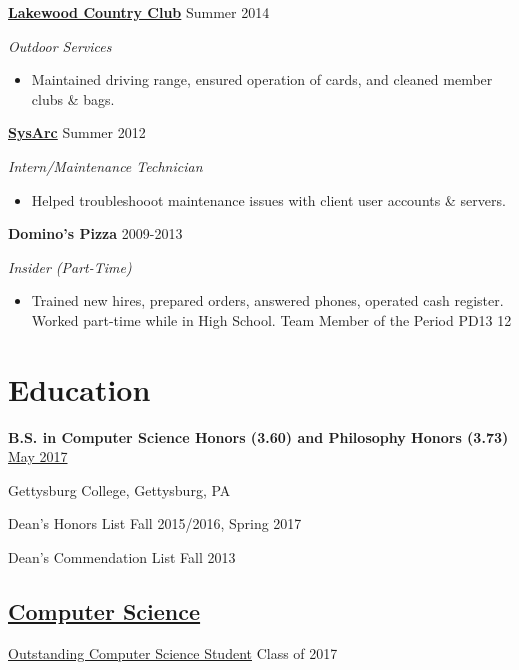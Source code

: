 \documentclass[11pt]{article}
\begin{document}
\textbf{\href{http://www.lakewoodcc.org/}{Lakewood Country Club}}
\hfill
Summer 2014

\textit{Outdoor Services}

\begin{itemize}
\item Maintained driving range, ensured operation of cards, and cleaned member clubs \& bags.\\
\end{itemize}

\textbf{\href{http://www.sysarc.com/}{SysArc}}
\hfill
Summer 2012

\textit{Intern/Maintenance Technician}

\begin{itemize}
\item  Helped troubleshooot maintenance issues with client user accounts \& servers.\\
\end{itemize}

\textbf{Domino's Pizza}
\hfill
2009-2013

\textit{Insider \small{(Part-Time)}}

\begin{itemize}
\item  Trained new hires, prepared orders, answered phones, operated cash register. Worked part-time while in High School. Team Member of the Period PD13 12
\end{itemize}

\section*{Education}
\textbf{B.S. in Computer Science {\footnotesize Honors (3.60)} and Philosophy {\footnotesize Honors (3.73)}}
\hfill
\href{https://www.gettysburg.edu/commencement/2017/pdfs/2017\%20Commencement\%20Program\%20FINAL.pdf}{May 2017}

Gettysburg College, Gettysburg, PA

Dean's Honors List \hfill Fall 2015/2016, Spring 2017

Dean's Commendation List \hfill Fall 2013

\subsection*{\underline{Computer Science}}

\href{http://www.gettysburg.edu/academics/cs/programs/honors.dot}{Outstanding Computer Science Student} \hfill Class of 2017
\end{document}
